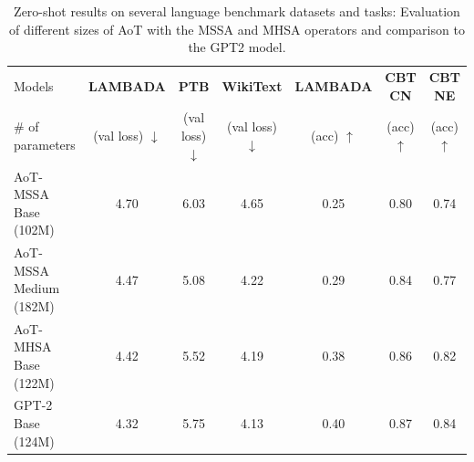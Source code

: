 \documentclass[../../book-main.tex]{subfiles}
\begin{document}
\begin{table}[!htbp]
\caption{Zero-shot results on several language benchmark datasets and tasks: Evaluation of different sizes of AoT with the MSSA and MHSA operators and comparison to the GPT2 model.}\vskip 0.1in
\centering
\begin{small}
\begin{tabular}{l|cccccc}
\toprule
 Models  & {\bf LAMBADA} & {\bf PTB} & {\bf WikiText} & {\bf LAMBADA} & {\bf CBT CN} & {\bf CBT NE} \\
 \# of parameters  & (val loss) $\downarrow$ &  (val loss) $\downarrow$ &(val loss) $\downarrow$ & (acc) $\uparrow$ &(acc) $\uparrow$ &(acc) $\uparrow$ \\
 \midrule
 AoT-MSSA Base (102M) & 4.70 & 6.03 & 4.65 & 0.25 & 0.80 & 0.74\\
 AoT-MSSA Medium (182M) & 4.47 & 5.08 & 4.22 & 0.29 & 0.84 & 0.77 \\
 AoT-MHSA Base (122M) & 4.42 & 5.52 & 4.19 & 0.38 & 0.86 & 0.82\\
 GPT-2 Base (124M) & 4.32 & 5.75 & 4.13 &  0.40 &  0.87 &  0.84 \\
\bottomrule
\end{tabular}
\label{tab:zeroshot}
\end{small}
\end{table} 
\vspace{-0.05in} 
\end{document}
